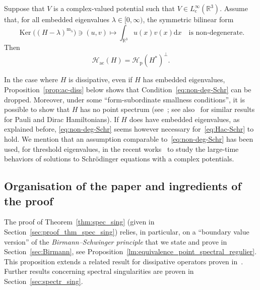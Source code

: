 \documentclass[10pt]{amsart}
\theoremstyle{definition}\newtheorem{defi}[theo]{Definition}\newtheorem{rema}[theo]{Remark}\newtheorem{exam}[theo]{Example}\newtheorem{exem}[theo]{Example}\newtheorem{nota}[theo]{Notation}
\newcommand{\Hi}{\mathcal{H}}
\newcommand{\R}{\mathbb{R}}
\newcommand{\rmp}{\mathrm{p}}
\newcommand{\acr}{\mathrm{ac}}
\newcommand{\rmc}{\mathrm{c}}
\newcommand{\rmd}{\mathrm{d}}
\newcommand{\rmm}{\mathrm{m}}
\DeclareMathOperator{\Ker}{Ker}
\begin{document}
\begin{prop}\label{prop:schr_H-ac}
Suppose that $V$ is a complex-valued potential such that $V \in L^\infty_{ \rmc }(\R^3)$. Assume that, for all embedded eigenvalues $\lambda\in[0,\infty)$, the symmetric bilinear form
\begin{equation}\label{eq:non-deg-Schr}
\Ker\big((H-\lambda)^{\rmm_\lambda}\big) \ni (u,v)\mapsto \int_{\R^3}u(x)v(x)\rmd x \quad\text{is non-degenerate}.
\end{equation}
Then
\begin{equation}\label{eq:Hac-Schr}
\Hi_\acr(H)=\Hi_\rmp(H^*)^\perp.
\end{equation}
\end{prop}

In the case where $H$ is dissipative, even if $H$ has embedded eigenvalues, Proposition~\ref{prop:ac-diss} below shows that Condition~\eqref{eq:non-deg-Schr} can be dropped. Moreover, under some ``form-subordinate smallness conditions'', it is possible to show that $H$ has no point spectrum (see~\cite{FaKrVe18_01}; see also~\cite{CoFaKr20_01} for similar results for Pauli and Dirac Hamiltonians). If $H$ does have embedded eigenvalues, as explained before, \eqref{eq:non-deg-Schr} seems however necessary for~\eqref{eq:Hac-Schr} to hold. We mention that an assumption comparable to~\eqref{eq:non-deg-Schr} has been used, for threshold eigenvalues, in the recent works~\cite{Aa21_01,Wa20_01} to study the large-time behaviors of solutions to Schr\"odinger equations with a complex potentials.

\subsection{Organisation of the paper and ingredients of the proof}\label{subsec:ideas}

The proof of Theorem~\ref{thm:spec_sing} (given in Section~\ref{sec:proof_thm_spec_sing}) relies, in particular, on a ``boundary value version'' of the \emph{Birmann--Schwinger principle} that we state and prove in Section~\ref{sec:Birmann}, see Proposition~\ref{lm:equivalence_point_spectral_regulier}. This proposition extends a related result for dissipative operators proven in~\cite[Lemma~4.1]{FaNi18_01}. Further results concerning spectral singularities are proven in Section~\ref{sec:spectr_sing}.
\end{document}
